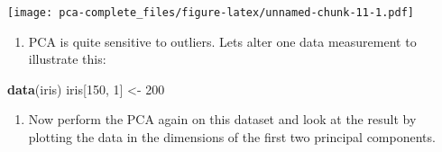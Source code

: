\documentclass[]{article}
\newenvironment{Shaded}{\begin{snugshade}}{\end{snugshade}}
\newcommand{\DataTypeTok}[1]{\textcolor[rgb]{0.13,0.29,0.53}{#1}}
\newcommand{\DecValTok}[1]{\textcolor[rgb]{0.00,0.00,0.81}{#1}}
\newcommand{\KeywordTok}[1]{\textcolor[rgb]{0.13,0.29,0.53}{\textbf{#1}}}
\newcommand{\NormalTok}[1]{#1}
\newcommand{\OperatorTok}[1]{\textcolor[rgb]{0.81,0.36,0.00}{\textbf{#1}}}
\newcommand{\StringTok}[1]{\textcolor[rgb]{0.31,0.60,0.02}{#1}}
\providecommand{\tightlist}{%
  \setlength{\itemsep}{0pt}\setlength{\parskip}{0pt}}
\begin{document}
\begin{Shaded}
\end{Shaded}

\texttt{[image: pca-complete\_files/figure-latex/unnamed-chunk-11-1.pdf]}

\begin{enumerate}
\def\labelenumi{\arabic{enumi})}
\setcounter{enumi}{8}
\tightlist
\item
  PCA is quite sensitive to outliers. Lets alter one data measurement to
  illustrate this:
\end{enumerate}

\begin{Shaded}
\begin{Highlighting}[]
\KeywordTok{data}\NormalTok{(iris)}
\NormalTok{iris[}\DecValTok{150}\NormalTok{, }\DecValTok{1}\NormalTok{] <-}\StringTok{ }\DecValTok{200}
\end{Highlighting}
\end{Shaded}

\begin{enumerate}
\def\labelenumi{\arabic{enumi})}
\setcounter{enumi}{9}
\tightlist
\item
  Now perform the PCA again on this dataset and look at the result by
  plotting the data in the dimensions of the first two principal
  components.
\end{enumerate}
\end{document}
